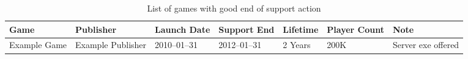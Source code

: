 \begin{landscape}
    \begin{table}[htbp]
        \centering
        \caption{List of games with good end of support action}%
        \label{tab:savedgames}
        \begin{tabular*}{1\textwidth}{lllllll}
            Game & Publisher & Launch Date & Support End & Lifetime & Player Count & Note \\ \toprule
            Example Game & Example Publisher & 2010--01--31 & 2012--01--31 & 2 Years & 200K & Server exe offered \\
        \end{tabular*}
    \end{table}
\end{landscape}
